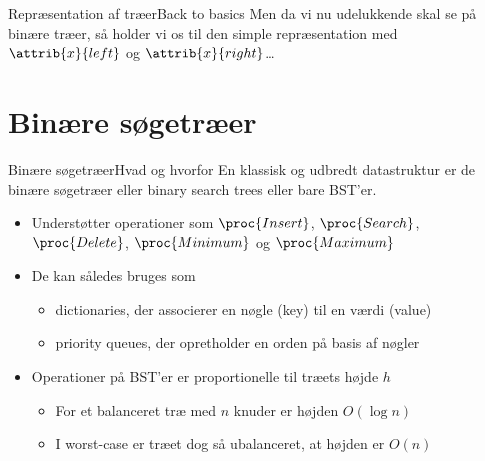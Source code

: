 \documentclass[aspectratio=1610]{beamer}
\begin{document}
\begin{frame}{Repræsentation af træer}{Back to basics}
    \centering
    Men da vi nu udelukkende skal se på \alert{binære træer}, så holder vi os
    til den simple repræsentation med $\attrib{x}{left}$ og
    $\attrib{x}{right}$\ldots
\end{frame}

\section{Binære søgetræer}

\begin{frame}{Binære søgetræer}{Hvad og hvorfor}
    En klassisk og udbredt datastruktur er de binære søgetræer eller
    \alert{binary search trees} eller bare BST'er. 

    \begin{itemize}
        \item Understøtter operationer som $\proc{Insert}$, $\proc{Search}$,
            $\proc{Delete}$, $\proc{Minimum}$ og $\proc{Maximum}$
        \item De kan således bruges som
            \begin{itemize}
                \item \alert{dictionaries}, der associerer en nøgle
                    (\alert{key}) til en værdi (\alert{value})
                \item \alert{priority queues}, der opretholder en orden på basis
                    af nøgler
            \end{itemize}
        \item Operationer på BST'er er proportionelle til træets højde $h$
            \begin{itemize}
                \item For et balanceret træ med $n$ knuder er højden $O(\log n)$
                \item I worst-case er træet dog så ubalanceret, at højden er
                    $O(n)$
            \end{itemize}
    \end{itemize}
\end{frame}
\end{document}
